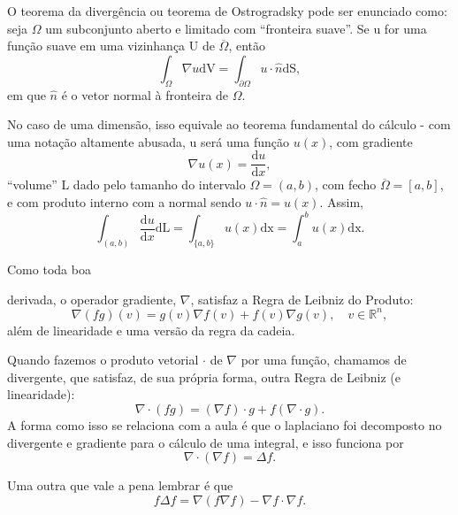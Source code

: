 \documentclass[.../pde_notes.tex]{subfiles}
\begin{document}
\begin{tcolorbox}[
		skin=enhanced,
		title=Lembrete!,
		after title={\hfill Teorema da Divergência},
		fonttitle=\bfseries,
		sharp corners=downhill,
		colframe=black,
		colbacktitle=yellow!75!white,
		colback=yellow!30,
		colbacklower=black,
		coltitle=black,
		drop large lifted shadow
	]
	O \hypertarget{divergence_theorem}{teorema da divergência} ou teorema de Ostrogradsky pode ser enunciado como: seja \(\Omega \) um subconjunto aberto e limitado com ``fronteira suave''. Se u for uma função suave em uma vizinhança U de \(\overline{\Omega }\), então
	\[
		\int_{\Omega }^{}\nabla u \mathrm{dV} = \int_{\partial \Omega }^{} u \cdot \hat{n} \mathrm{dS},
	\]
	em que \(\hat{n}\) é o vetor normal à fronteira de \(\Omega \).

	No caso de uma dimensão, isso equivale ao teorema fundamental do cálculo - com uma notação altamente abusada, u será uma função \(u(x)\), com gradiente
	\[
		\nabla u(x)=\frac{\mathrm{d}u}{\mathrm{d}x},
	\]
	``volume'' L dado pelo tamanho do intervalo \(\Omega = (a, b)\), com fecho \(\overline{\Omega }=[a, b]\), e com produto interno com a normal sendo \(u \cdot \hat{n} = u(x).\) Assim,
	\[
		\int_{(a, b)}^{}\frac{\mathrm{d}u}{\mathrm{d}x} \mathrm{dL} = \int_{\{a, b\}}^{} u(x) \mathrm{dx} = \int_{a}^{b}u(x) \mathrm{dx}.
	\]
\end{tcolorbox}
\begin{tcolorbox}[
		skin=enhanced,
		title=Lembrete!,
		after title={\hfill Propriedades do Divergente e Naplaciano},
		fonttitle=\bfseries,
		sharp corners=downhill,
		colframe=black,
		colbacktitle=yellow!75!white,
		colback=yellow!30,
		colbacklower=black,
		coltitle=black,
		drop large lifted shadow
	]
	\hypertarget{gradient_properties}{Como toda boa} derivada, o operador gradiente, \(\nabla \), satisfaz a Regra de Leibniz do Produto:
	\[
		\nabla (fg)(v) = g(v)\nabla f(v) + f(v) \nabla g(v),\quad v\in \mathbb{R}^{n},
	\]
	além de linearidade e uma versão da regra da cadeia.

	Quando fazemos o produto vetorial \(\cdot \) de \(\nabla \) por uma função, chamamos de divergente, que satisfaz, de sua própria forma, outra Regra de Leibniz (e linearidade):
	\[
		\nabla \cdot (fg) = (\nabla f)\cdot g + f (\nabla \cdot g).
	\]
	A forma como isso se relaciona com a aula é que o laplaciano foi decomposto no divergente e gradiente para o cálculo de uma integral, e isso funciona por
	\[
		\nabla \cdot (\nabla f) = \Delta f.
	\]

	Uma outra que vale a pena lembrar é que
	\[
		f\Delta f = \nabla (f \nabla f) - \nabla f \cdot \nabla f.
	\]
\end{tcolorbox}
\end{document}
